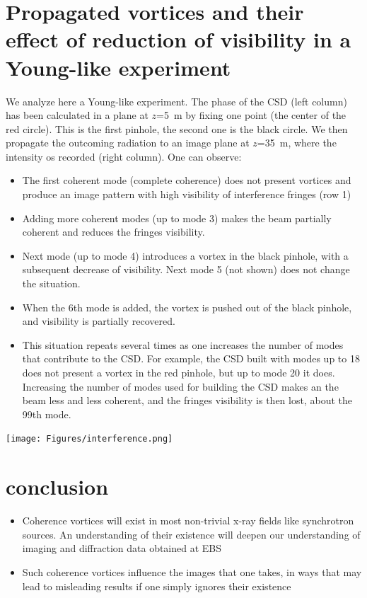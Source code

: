 \documentclass[a4paper,10pt]{article}
\begin{document}
 
 \section{Propagated vortices and their effect of reduction of visibility in a Young-like experiment}

We analyze here a Young-like experiment. The phase of the CSD (left column) has been calculated in a plane at $z$=5~m by fixing one point (the center of the red circle). This is the first pinhole, the second one is the black circle. We then propagate the outcoming radiation to an image plane at $z$=35~m, where the intensity os recorded (right column). One can observe: 

\begin{itemize}
\item The first coherent mode (complete coherence) does not present vortices and produce an image pattern with high visibility of interference fringes (row 1)
\item Adding more coherent modes (up to mode 3) makes the beam partially coherent and reduces the fringes visibility. 
\item Next mode (up to mode 4) introduces a vortex in the black pinhole, with a subsequent decrease of visibility. Next mode 5 (not shown) does not change the situation. 
\item When the 6th mode is added, the vortex is pushed out of the black pinhole, and visibility is partially recovered. 
\item This situation repeats several times as one increases the number of modes that contribute to the CSD. For example, the CSD built with modes up to 18 does not present a vortex in the red pinhole, but up to mode 20 it does. Increasing the number of modes used for building the CSD makes an the beam less and less coherent, and the fringes visibility is then lost, about the 99th mode.

\end{itemize}

\begin{center}
 \texttt{[image: Figures/interference.png]}
 \end{center}

\section{conclusion}

\begin{itemize}
\item Coherence vortices will exist in most non-trivial x-ray fields like synchrotron sources. An understanding of their existence will deepen our understanding of imaging and diffraction data obtained at EBS
\item Such coherence vortices influence the images that one takes, in ways that may lead to misleading results if one simply ignores their existence
\end{itemize}
 
 
 
 
 
 
 
 
 


\end{document}
